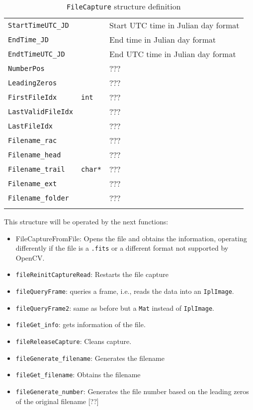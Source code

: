 \documentclass[a4paper,11pt]{memoir}
\begin{document}
\begin{center}
\begin{longtable}{|m{}|m{}|m{}|}
\texttt{StartTimeUTC\_JD} & & Start UTC time in Julian day format \\ \cline{1-1} \cline{3-3}
\texttt{EndTime\_JD} & & End time in Julian day format \\ \cline{1-1} \cline{3-3}
\texttt{EndtTimeUTC\_JD} & & End UTC time in Julian day format \\ \hline
\texttt{NumberPos} & \multirow{5}{*}{\texttt{int}} & ??? \\ \cline{1-1} \cline{3-3}
\texttt{LeadingZeros} & & ??? \\ \cline{1-1} \cline{3-3}
\texttt{FirstFileIdx} & & ??? \\ \cline{1-1} \cline{3-3}
\texttt{LastValidFileIdx} & & ??? \\ \cline{1-1} \cline{3-3}
\texttt{LastFileIdx} & & ??? \\ \cline{1-1} \hline
\texttt{Filename\_rac} & \multirow{5}{*}{\texttt{char*}} & ??? \\ \cline{1-1} \cline{3-3}
\texttt{Filename\_head} & & ??? \\ \cline{1-1} \cline{3-3}
\texttt{Filename\_trail} & & ??? \\ \cline{1-1} \cline{3-3}
\texttt{Filename\_ext} & & ??? \\ \cline{1-1} \cline{3-3}
\texttt{Filename\_folder} & & ??? \\ \cline{1-1} \hline
\caption{\texttt{FileCapture} structure definition}
\label{my-label}
\end{longtable}
\end{center}

This structure will be operated by the next functions:
\begin{itemize}
\item FileCaptureFromFile: Opens the file and obtains the information, operating differently if the file is a \texttt{.fits} or a different format not supported by OpenCV.
\item \texttt{fileReinitCaptureRead}: Restarts the file capture
\item \texttt{fileQueryFrame}: queries a frame, i.e., reads the data into an \texttt{IplImage}.
\item \texttt{fileQueryFrame2}: same as before but a \texttt{Mat} instead of \texttt{IplImage}.
\item \texttt{fileGet\_info}: gets information of the file.
\item \texttt{fileReleaseCapture}: Cleans capture.
\item \texttt{fileGenerate\_filename}: Generates the filename
\item \texttt{fileGet\_filename}: Obtains the filename
\item \texttt{fileGenerate\_number}: Generates the file number based on the leading zeros of the original filename [??]
\end{itemize}
\end{document}
